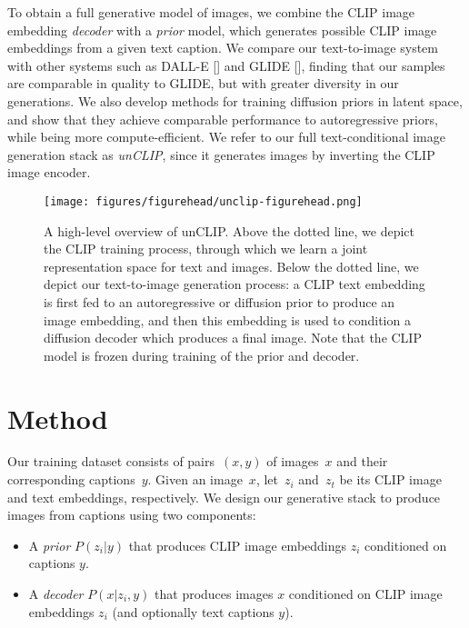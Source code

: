 \documentclass{article}
\newcommand{\shortcite}[1]{[\citenum{#1}]}
\newcommand{\modelname}{unCLIP}
\begin{document}
To obtain a full generative model of images, we combine the CLIP image embedding \textit{decoder} with a \textit{prior} model, which generates possible CLIP image embeddings from a given text caption. We compare our text-to-image system with other systems such as DALL-E \shortcite{dalle} and GLIDE \shortcite{glide}, finding that our samples are comparable in quality to GLIDE, but with greater diversity in our generations. We also develop methods for training diffusion priors in latent space, and show that they achieve comparable performance to autoregressive priors, while being more compute-efficient. We refer to our full text-conditional image generation stack as \textit{\modelname{}}, since it generates images by inverting the CLIP image encoder.

\begin{figure}[t]
    \centering
    \setlength{\tabcolsep}{2.0pt}
    \texttt{[image: figures/figurehead/unclip-figurehead.png]}

    \caption{A high-level overview of \modelname{}. Above the dotted line, we depict the CLIP training process, through which we learn a joint representation space for text and images. Below the dotted line, we depict our text-to-image generation process: a CLIP text embedding is first fed to an autoregressive or diffusion prior to produce an image embedding, and then this embedding is used to condition a diffusion decoder which produces a final image. Note that the CLIP model is frozen during training of the prior and decoder.}
    \label{fig:figurehead}
    \vskip -0.1in 
\end{figure}

\section{Method}
Our training dataset consists of pairs~$(x,y)$ of images~$x$ and their corresponding captions~$y$. Given an image~$x$, let~$z_i$ and~$z_t$ be its CLIP image and text embeddings, respectively. We design our generative stack to produce images from captions using two components:

\begin{itemize}
    \item A \textit{prior} $P(z_i|y)$ that produces CLIP image embeddings $z_i$ conditioned on captions $y$.
    \item A \textit{decoder} $P(x|z_i,y)$ that produces images $x$ conditioned on CLIP image embeddings $z_i$ (and optionally text captions $y$). 
\end{itemize}
\end{document}
